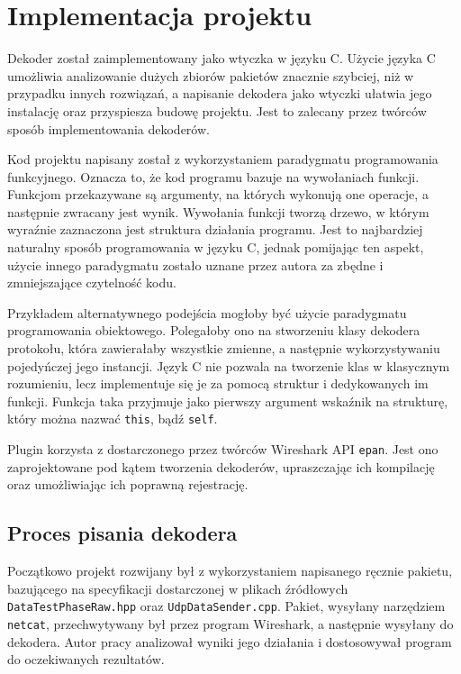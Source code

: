 \documentclass[a4paper, 12pt, twoside, openright]{article}
\begin{document}
	\indent\par


\newpage
\section{Implementacja projektu}

	Dekoder został zaimplementowany jako wtyczka w języku C. Użycie języka C umożliwia analizowanie dużych zbiorów pakietów znacznie
	szybciej, niż w przypadku innych rozwiązań, a napisanie dekodera jako wtyczki ułatwia jego instalację oraz przyspiesza budowę projektu.
	Jest to zalecany przez twórców sposób implementowania dekoderów.

	Kod projektu napisany został z wykorzystaniem paradygmatu programowania funkcyjnego. Oznacza to, że kod programu bazuje na wywołaniach
	funkcji. Funkcjom przekazywane są argumenty, na których wykonują one operacje, a następnie zwracany jest wynik. Wywołania funkcji tworzą drzewo,
	w którym wyraźnie zaznaczona jest struktura działania programu. Jest to najbardziej naturalny sposób programowania w języku C,
	jednak pomijając ten aspekt, użycie innego paradygmatu zostało uznane przez autora za zbędne i zmniejszające czytelność kodu.

	Przykładem alternatywnego podejścia mogłoby być użycie paradygmatu programowania obiektowego. Polegałoby ono na stworzeniu
	klasy dekodera protokołu, która zawierałaby wszystkie zmienne, a następnie wykorzystywaniu pojedyńczej jego instancji. Język C
	nie pozwala na tworzenie klas w klasycznym rozumieniu, lecz implementuje się je za pomocą struktur i dedykowanych im funkcji.
	Funkcja taka przyjmuje jako pierwszy argument wskaźnik na strukturę, który można nazwać \texttt{this}, bądź \texttt{self}.

	Plugin korzysta z dostarczonego przez twórców Wireshark API \texttt{epan}. Jest ono zaprojektowane pod kątem tworzenia dekoderów,
	upraszczając ich kompilację oraz umożliwiając ich poprawną rejestrację.

	\subsection{Proces pisania dekodera}

	Początkowo projekt rozwijany był z wykorzystaniem napisanego ręcznie pakietu, bazującego na specyfikacji dostarczonej w plikach
	źródłowych \texttt{DataTestPhaseRaw.hpp} oraz \texttt{UdpDataSender.cpp}. Pakiet, wysyłany narzędziem \texttt{netcat},
	przechwytywany był przez program Wireshark, a następnie wysyłany do dekodera. Autor pracy analizował wyniki jego działania
	i dostosowywał program do oczekiwanych rezultatów.
\end{document}
